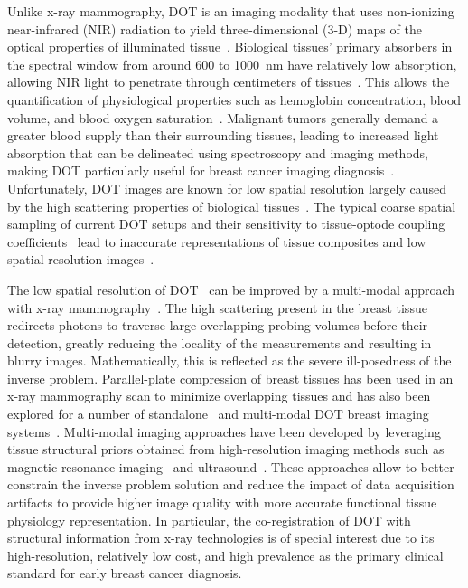 Unlike x-ray mammography, \ac{DOT} is an imaging modality that uses non-ionizing near-infrared (\ac{NIR}) radiation to yield three-dimensional (3-D) maps of the optical properties of illuminated tissue~\cite{Boas2001, Dehghani2009, Yamada2014, Hoshi2016}. Biological tissues' primary absorbers in the spectral window from around 600 to 1000~nm have relatively low absorption, allowing \ac{NIR} light to penetrate through centimeters of tissues~\cite{Gibson2005}. This allows the quantification of physiological properties such as hemoglobin concentration, blood volume, and blood oxygen saturation~\cite{Leff2008, Boas2001}. Malignant tumors generally demand a greater blood supply than their surrounding tissues, leading to increased light absorption that can be delineated using spectroscopy and imaging methods, making \ac{DOT} particularly useful for breast cancer imaging diagnosis~\cite{Wang2022, Vavadi2014, Flexman2013, Choe2009, Taroni2005}. Unfortunately, \ac{DOT} images are known for low spatial resolution largely caused by the high scattering properties of biological tissues~\cite{Boas2001}. The typical coarse spatial sampling of current \ac{DOT} setups and their sensitivity to tissue-optode coupling coefficients~\cite{Schweiger2007} lead to inaccurate representations of tissue composites and low spatial resolution images~\cite{Durduran2010}.

The low spatial resolution of \ac{DOT}~\cite{Li2010} can be improved by a multi-modal approach with x-ray mammography~\cite{Zimmermann2017, Deng2015, Deng2015a, Fang2009a}. The high scattering present in the breast tissue redirects photons to traverse large overlapping probing volumes before their detection, greatly reducing the locality of the measurements and resulting in blurry images. Mathematically, this is reflected as the severe ill-posedness of the inverse problem. Parallel-plate compression of breast tissues has been used in an x-ray mammography scan to minimize overlapping tissues and has also been explored for a number of standalone~\cite{Choe2009, Culver2003} and multi-modal \ac{DOT} breast imaging systems~\cite{ZhuReview2020, Fang2009a, Krishnaswamy2012}. Multi-modal imaging approaches have been developed by leveraging tissue structural priors obtained from high-resolution imaging methods such as magnetic resonance imaging~\cite{Ghussein2013,Ntziachristos2002} and ultrasound~\cite{Zhu2010}. These approaches allow to better constrain the inverse problem solution and reduce the impact of data acquisition artifacts to provide higher image quality with more accurate functional tissue physiology representation. In particular, the co-registration of \ac{DOT} with structural information from x-ray technologies is of special interest due to its high-resolution, relatively low cost, and high prevalence as the primary clinical standard for early breast cancer diagnosis.

